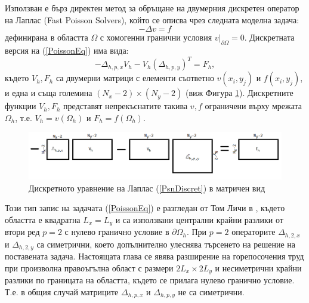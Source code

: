 \documentclass[a5paper]{article}
\newcommand{\be}{\begin{equation}}
\newcommand{\ee}{\end{equation}}
\newcommand{\rf}[1]{(\ref{#1})}
\theoremstyle{remark}
\begin{document}
\begin{normalsize}
Използван е бърз директен метод за обръщане на двумерния дискретен оператор на Лаплас (Fast Poisson Solvers), който се описва чрез следната моделна задача:
\be\label{PoissonEq}
-\Delta v = f
\ee
дефинирана в областта $\Omega$ с хомогенни гранични условия $v \big|_{\partial\Omega} = 0$. Дискретната версия на \rf{PoissonEq} има вида:
\be\label{PsnDiscret}
-\Delta_{h,p,x}  V_h - V_h (\Delta_{h,p,y})^T = F_h,
\ee
където $V_h, F_h$ са двумерни матрици с елементи съответно $v(x_i,y_j)$ и  $f(x_i,y_j)$, и една и съща големина $(N_x-2)\times(N_y-2)$ (виж Фигура \ref{fig:FPSexplained}). Дискретните функции $V_h, F_h$ представят непрекъснатите такива $v, f$ ограничени върху мрежата $\Omega_h$, т.е. $V_h = v(\Omega_h)$ и $F_h = f(\Omega_h)$.
\begin{figure}[ht]
     \includegraphics[width=\linewidth]{FPSExplained.png}
	\caption{Дискретното уравнение на Лаплас \rf{PsnDiscret} в матричен вид}
	\label{fig:FPSexplained}
\end{figure}
\FloatBarrier
Този тип запис на задачата \rf{PoissonEq} е разгледан от Том Личи в \cite{ref34}, където областта е квадратна $L_x = L_y$ и са използвани централни крайни разлики от втори ред $p=2$ с нулево гранично условие в $\partial \Omega_h$. При $p=2$ операторите $\Delta_{h,2,x}$ и $\Delta_{h,2,y}$ са симетрични, което допълнително улеснява търсенето на решение на поставената задача. Настоящата глава се явява разширение на горепосочения труд при произволна правоъгълна област с размери $2L_x \times 2L_y$ и несиметрични крайни разлики по границата на областта, където се прилага нулево гранично условие. Т.е. в общия случай матриците $\Delta_{h,p,x}$ и $\Delta_{h,p,y}$ не са симетрични.


\end{normalsize}
\end{document}
